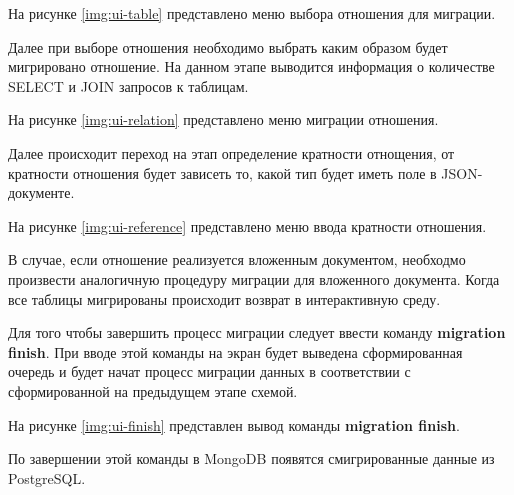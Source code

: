 На рисунке \ref{img:ui-table} представлено меню выбора отношения для миграции.

\clearpage

Далее при выборе отношения необходимо выбрать каким образом будет мигрировано отношение.
На данном этапе выводится информация о количестве SELECT и JOIN запросов к таблицам.

На рисунке \ref{img:ui-relation} представлено меню миграции отношения.

Далее происходит переход на этап определение кратности отнощения, 
от кратности отношения будет зависеть то, какой тип будет иметь поле в JSON-документе.

\clearpage

На рисунке \ref{img:ui-reference} представлено меню ввода кратности отношения.


В случае, если отношение реализуется вложенным документом, 
необходмо произвести аналогичную процедуру миграции для вложенного документа.
Когда все таблицы мигрированы происходит возврат в интерактивную среду.

Для того чтобы завершить процесс миграции следует ввести команду \textbf{migration finish}.
При вводе этой команды на экран будет выведена сформированная очередь и будет начат процесс миграции данных
в соответствии с сформированной на предыдущем этапе схемой.

На рисунке \ref{img:ui-finish} представлен вывод команды \textbf{migration finish}.

По завершении этой команды в MongoDB появятся смигрированные данные из PostgreSQL.
